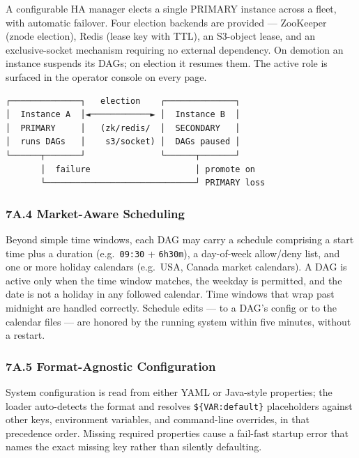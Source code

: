 \documentclass[
]{article}
\begin{document}
A configurable HA manager elects a single PRIMARY instance across a
fleet, with automatic failover. Four election backends are provided ---
ZooKeeper (znode election), Redis (lease key with TTL), an S3-object
lease, and an exclusive-socket mechanism requiring no external
dependency. On demotion an instance suspends its DAGs; on election it
resumes them. The active role is surfaced in the operator console on
every page.

\begin{verbatim}
┌──────────────┐   election    ┌──────────────┐
│  Instance A  │◄────────────► │  Instance B  │
│  PRIMARY     │   (zk/redis/  │  SECONDARY   │
│  runs DAGs   │    s3/socket) │  DAGs paused │
└──────┬───────┘               └──────┬───────┘
       │  failure                     │ promote on
       └──────────────────────────────┘ PRIMARY loss
\end{verbatim}

\hypertarget{a.4-market-aware-scheduling}{%
\subsubsection{7A.4 Market-Aware
Scheduling}\label{a.4-market-aware-scheduling}}

Beyond simple time windows, each DAG may carry a schedule comprising a
start time plus a duration (e.g.~\texttt{09:30} + \texttt{6h30m}), a
day-of-week allow/deny list, and one or more holiday calendars
(e.g.~USA, Canada market calendars). A DAG is active only when the time
window matches, the weekday is permitted, and the date is not a holiday
in any followed calendar. Time windows that wrap past midnight are
handled correctly. Schedule edits --- to a DAG's config or to the
calendar files --- are honored by the running system within five
minutes, without a restart.

\hypertarget{a.5-format-agnostic-configuration}{%
\subsubsection{7A.5 Format-Agnostic
Configuration}\label{a.5-format-agnostic-configuration}}

System configuration is read from either YAML or Java-style properties;
the loader auto-detects the format and resolves
\texttt{\$\{VAR:default\}} placeholders against other keys, environment
variables, and command-line overrides, in that precedence order. Missing
required properties cause a fail-fast startup error that names the exact
missing key rather than silently defaulting.
\end{document}
